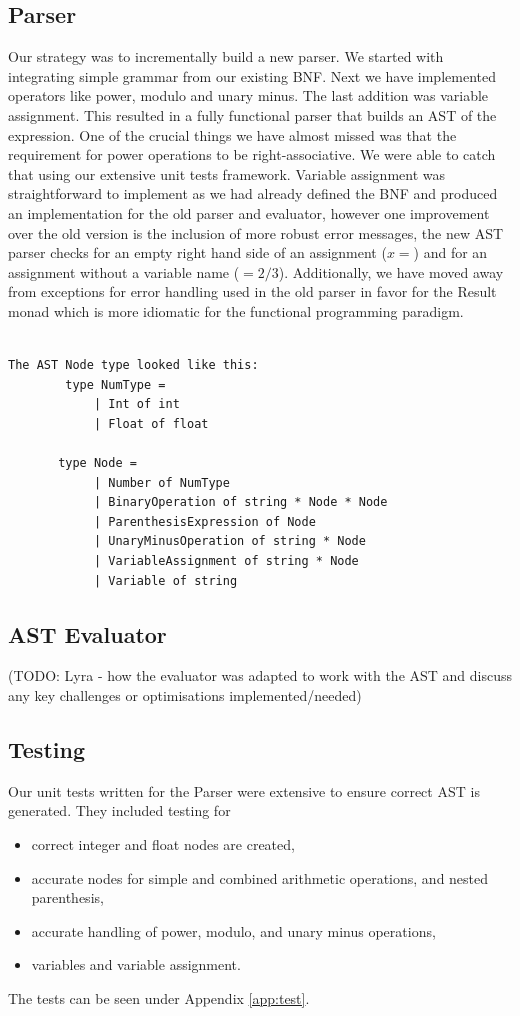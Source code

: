 \documentclass[a4paper, oneside, 11pt]{report}
\begin{document}
\subsection{Parser}
Our strategy was to incrementally build a new parser. We started with integrating simple grammar from our existing BNF. Next we have implemented operators like power, modulo and unary minus. The last addition was variable assignment. This resulted in a fully functional parser that builds an AST of the expression. One of the crucial things we have almost missed was that the requirement for power operations to be right-associative. We were able to catch that using our extensive unit tests framework.
Variable assignment was straightforward to implement as we had already defined the BNF and produced an implementation for the old parser and evaluator, however one improvement over the old version is the inclusion of more robust error messages, the new AST parser checks for an empty right hand side of an assignment ($x = $) and for an assignment without a variable name ($= 2/3$). Additionally, we have moved away from exceptions for error handling used in the old parser in favor for the Result monad which is more idiomatic for the functional programming paradigm.
\begin{verbatim}
    
The AST Node type looked like this:
        type NumType =
            | Int of int
            | Float of float

       type Node =
            | Number of NumType
            | BinaryOperation of string * Node * Node
            | ParenthesisExpression of Node
            | UnaryMinusOperation of string * Node
            | VariableAssignment of string * Node
            | Variable of string
\end{verbatim}
\subsection{AST Evaluator}
(TODO: Lyra - how the evaluator was adapted to work with the AST and discuss any key challenges or optimisations implemented/needed)

\subsection{Testing}
Our unit tests written for the Parser were extensive to ensure correct AST is generated. They included testing for
\begin{itemize}
    \item correct integer and float nodes are created, 
    \item accurate nodes for simple and combined arithmetic operations, and nested parenthesis,
    \item accurate handling of power, modulo, and unary minus operations, 
    \item variables and variable assignment. 
\end{itemize}
The tests can be seen under Appendix \ref{app:test}.
\end{document}
